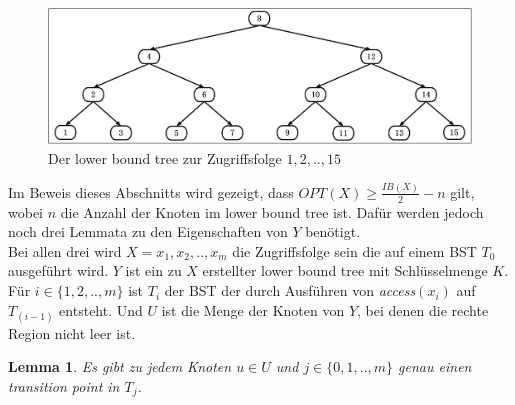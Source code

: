 \documentclass[a4paper,12pt]{article}
\newtheorem{Lemma}{Lemma}[section]
\begin{document}
\begin{figure}[H]
	\centering
	\includegraphics[width=1\textwidth]{"Medien/Tango/lowerBoundTree"}
	\caption{Der lower bound tree zur Zugriffsfolge $1 ,2, .., 15$  }
	\label{fig:demlowerBoundTree}
\end{figure}

\noindent Im Beweis dieses Abschnitts wird gezeigt, dass $\mathit{OPT}\left(X\right) \geq \frac{\mathit{IB}\left(X\right)}{2} - n$ gilt, wobei $n$ die Anzahl der Knoten im lower bound tree ist. Dafür werden jedoch noch drei Lemmata zu den Eigenschaften von $Y$ benötigt.\\
 Bei allen drei wird $X = x_1, x_2,.., x_m$ die Zugriffsfolge sein die auf einem BST $T_0$ ausgeführt wird. $Y$ ist ein zu $X$ erstellter lower bound tree mit Schlüsselmenge $K$.
Für $i \in \{1,2,..,m\}$ ist $T_i$ der BST der durch Ausführen von \textit{access}$\left(x_i\right)$ auf $T_{\left(i-1\right)}$ entsteht. Und $U$ ist die Menge der Knoten von $Y$, bei denen die rechte Region nicht leer ist.
\begin{Lemma} \label{demaineLemma1}
Es gibt zu jedem Knoten $u \in U$ und $j \in \{0,1,..,m\}$ genau einen transition point in $T_j$. 	
\end{Lemma}
\end{document}
